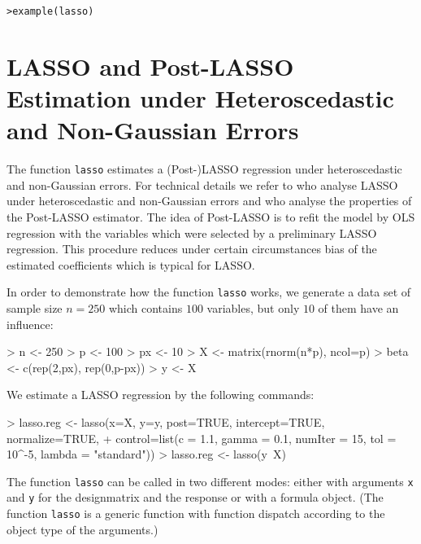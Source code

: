 \documentclass{amsart}
\begin{document}
\vspace{2mm}
\noindent
\texttt{>example(lasso)}

\vspace{2mm}
\noindent

\section{LASSO and Post-LASSO Estimation under Heteroscedastic and Non-Gaussian Errors}
The function \texttt{lasso} estimates a (Post-)LASSO regression under heteroscedastic and non-Gaussian errors. For technical details we refer to \cite{BCCH12} who analyse LASSO under heteroscedastic and non-Gaussian errors and \cite{BC-PostLASSO} who analyse the properties of the Post-LASSO estimator. The idea of Post-LASSO is to refit the model by OLS regression with the variables which were selected by a preliminary LASSO regression. This procedure reduces under certain circumstances bias of the estimated coefficients which is typical for LASSO.

In order to demonstrate how the function \texttt{lasso} works, we generate a data set of sample size $n=250$ which contains $100$ variables, but only $10$ of them have an influence:
\begin{Schunk}
\begin{Sinput}
> n <- 250
> p <- 100
> px <- 10
> X <- matrix(rnorm(n*p), ncol=p)
> beta <- c(rep(2,px), rep(0,p-px))
> y <- X %
\end{Sinput}
\end{Schunk}
We estimate a LASSO regression by the following commands:
\begin{Schunk}
\begin{Sinput}
> lasso.reg <- lasso(x=X, y=y, post=TRUE, intercept=TRUE, normalize=TRUE, 
+       control=list(c = 1.1, gamma = 0.1, numIter = 15, tol = 10^-5, lambda = "standard"))
> lasso.reg <- lasso(y~X) 
\end{Sinput}
\end{Schunk}
The function \texttt{lasso} can be called in two different modes: either with arguments \texttt{x} and \texttt{y} for the designmatrix and the response or with a formula object. (The function \texttt{lasso} is a generic function with function dispatch according to the object type of the arguments.)
\end{document}
